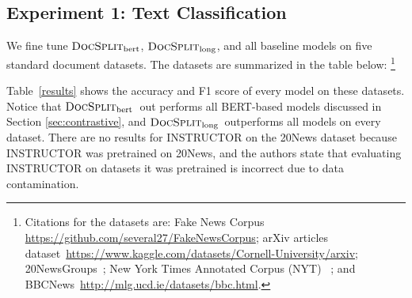 \documentclass[11pt]{article}
\newcommand{\our}{\mbox{\textsc{DocSplit}}}
\newcommand{\ourbert}{$\our_{\mathrm{bert}}$}
\newcommand{\ourlong}{$\our_{\mathrm{long}}$}
\begin{document}
\subsection{Experiment 1: Text Classification}
%
We fine tune \ourbert, \ourlong, and all baseline models on five standard document datasets.
The datasets are summarized in the table below:%
\footnote{Citations for the datasets are:
Fake News Corpus \url{https://github.com/several27/FakeNewsCorpus};
arXiv articles dataset~\url{https://www.kaggle.com/datasets/Cornell-University/arxiv};
20NewsGroups~\cite{Lang1995NewsWeederLT};
New York Times Annotated Corpus (NYT) ~\cite{sandhaus2008new}; and
BBCNews~\url{http://mlg.ucd.ie/datasets/bbc.html}.
}

\begin{table}[H]
\centering

\label{dataset}
\end{table}

\noindent

Table~\ref{results} shows the accuracy and F1 score of every model on these datasets.
Notice that \ourbert~out performs all BERT-based models discussed in Section \ref{sec:contrastive},
and \ourlong~outperforms all models on every dataset.
There are no results for INSTRUCTOR on the 20News dataset because INSTRUCTOR was pretrained on 20News,
and the authors state that evaluating INSTRUCTOR on datasets it was pretrained is incorrect due to data contamination.
\end{document}
